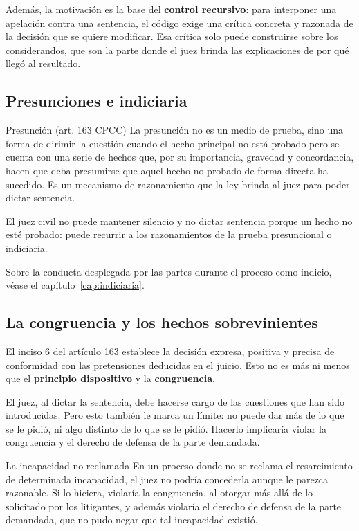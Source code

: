 \documentclass[12pt,oneside]{book}
\begin{document}
Además, la motivación es la base del \textbf{control recursivo}: para interponer una apelación contra una sentencia, el código exige una crítica concreta y razonada de la decisión que se quiere modificar. Esa crítica solo puede construirse sobre los considerandos, que son la parte donde el juez brinda las explicaciones de por qué llegó al resultado.

\subsection{Presunciones e indiciaria}

\begin{definition}{Presunción (art. 163 CPCC)}
La presunción no es un medio de prueba, sino una forma de dirimir la cuestión cuando el hecho principal no está probado pero se cuenta con una serie de hechos que, por su importancia, gravedad y concordancia, hacen que deba presumirse que aquel hecho no probado de forma directa ha sucedido. Es un mecanismo de razonamiento que la ley brinda al juez para poder dictar sentencia.
\end{definition}

El juez civil no puede mantener silencio y no dictar sentencia porque un hecho no esté probado: puede recurrir a los razonamientos de la prueba presuncional o indiciaria.

Sobre la conducta desplegada por las partes durante el proceso como indicio, véase el capítulo~\ref{cap:indiciaria}.

\subsection{La congruencia y los hechos sobrevinientes}

El inciso 6\textordmasculine{} del artículo 163 establece la decisión expresa, positiva y precisa de conformidad con las pretensiones deducidas en el juicio. Esto no es más ni menos que el \textbf{principio dispositivo} y la \textbf{congruencia}.

\begin{important}
El juez, al dictar la sentencia, debe hacerse cargo de las cuestiones que han sido introducidas. Pero esto también le marca un límite: no puede dar más de lo que se le pidió, ni algo distinto de lo que se le pidió. Hacerlo implicaría violar la congruencia y el derecho de defensa de la parte demandada.
\end{important}

\begin{example}{La incapacidad no reclamada}
En un proceso donde no se reclama el resarcimiento de determinada incapacidad, el juez no podría concederla aunque le parezca razonable. Si lo hiciera, violaría la congruencia, al otorgar más allá de lo solicitado por los litigantes, y además violaría el derecho de defensa de la parte demandada, que no pudo negar que tal incapacidad existió.
\end{example}
\end{document}
